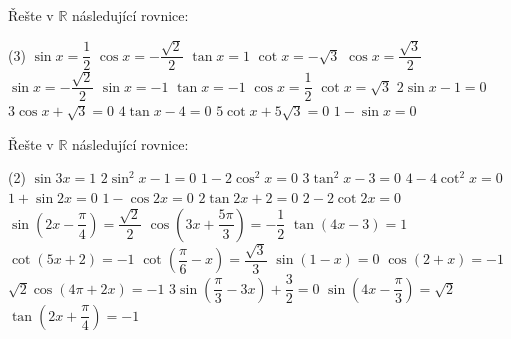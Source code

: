 \documentclass[12pt,a4paper]{article}
\begin{document}
\setcounter{section}{2}
\begin{exercise}
    Řešte v $\mathbb{R}$ následující rovnice:
    \begin{tasks}(3)
        \task $\sin x = \dfrac{1}{2}$
        \task $\cos x = -\dfrac{\sqrt{2}}{2}$
        \task $\tan x = 1$
        \task $\cot x = -\sqrt{3}$
        \task $\cos x = \dfrac{\sqrt{3}}{2}$
        \task $\sin x = -\dfrac{\sqrt{2}}{2}$
        \task $\sin x = -1$
        \task $\tan x = -1$
        \task $\cos x = \dfrac{1}{2}$
        \task $\cot x = \sqrt{3}$
        \task $2 \sin x - 1 = 0$
        \task $3 \cos x + \sqrt{3} = 0$
        \task $4 \tan x - 4 = 0$
        \task $5 \cot x + 5\sqrt{3} = 0$
        \task $1 - \sin x = 0$
    \end{tasks}
\end{exercise}


\begin{exercise}
    Řešte v $\mathbb{R}$ následující rovnice:
    \begin{tasks}(2)
        \task $\sin 3x = 1$
        \task $2 \sin^2 x - 1 = 0$
        \task $1 - 2 \cos^2 x = 0$
        \task $3 \tan^2 x - 3 = 0$
        \task $4 - 4 \cot^2 x = 0$
        \task $1 + \sin 2x = 0$
        \task $1 - \cos 2x = 0$
        \task $2 \tan 2x + 2 = 0$
        \task $2 - 2 \cot 2x = 0$
        \task $\sin \left(2x - \dfrac{\pi}{4}\right) = \dfrac{\sqrt{2}}{2}$
        \task $\cos \left(3x + \dfrac{5\pi}{3}\right) = -\dfrac{1}{2}$
        \task $\tan \left(4x - 3\right) = 1$
        \task $\cot \left(5x + 2\right) = -1$
        \task $\cot \left(\dfrac{\pi}{6} - x\right) = \dfrac{\sqrt{3}}{3}$
        \task $\sin \left(1 - x\right) = 0$
        \task $\cos \left(2 + x\right) = -1$
        \task $\sqrt{2} \cos \left(4\pi + 2x\right) = -1$
        \task $3 \sin \left(\dfrac{\pi}{3} - 3x\right) + \dfrac{3}{2} = 0$
        \task $\sin \left(4x - \dfrac{\pi}{3}\right) = \sqrt{2}$
        \task $\tan \left(2x + \dfrac{\pi}{4}\right) = -1$
    \end{tasks}
\end{exercise}
\end{document}
